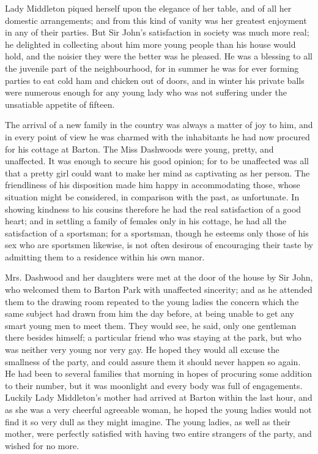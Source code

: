 Lady Middleton piqued herself upon the elegance of her table, and of all her domestic arrangements; and from this kind of vanity was her greatest enjoyment in any of their parties. But Sir John's satisfaction in society was much more real; he delighted in collecting about him more young people than his house would hold, and the noisier they were the better was he pleased. He was a blessing to all the juvenile part of the neighbourhood, for in summer he was for ever forming parties to eat cold ham and chicken out of doors, and in winter his private balls were numerous enough for any young lady who was not suffering under the unsatiable appetite of fifteen.

The arrival of a new family in the country was always a matter of joy to him, and in every point of view he was charmed with the inhabitants he had now procured for his cottage at Barton. The Miss Dashwoods were young, pretty, and unaffected. It was enough to secure his good opinion; for to be unaffected was all that a pretty girl could want to make her mind as captivating as her person. The friendliness of his disposition made him happy in accommodating those, whose situation might be considered, in comparison with the past, as unfortunate. In showing kindness to his cousins therefore he had the real satisfaction of a good heart; and in settling a family of females only in his cottage, he had all the satisfaction of a sportsman; for a sportsman, though he esteems only those of his sex who are sportsmen likewise, is not often desirous of encouraging their taste by admitting them to a residence within his own manor.

Mrs. Dashwood and her daughters were met at the door of the house by Sir John, who welcomed them to Barton Park with unaffected sincerity; and as he attended them to the drawing room repeated to the young ladies the concern which the same subject had drawn from him the day before, at being unable to get any smart young men to meet them. They would see, he said, only one gentleman there besides himself; a particular friend who was staying at the park, but who was neither very young nor very gay. He hoped they would all excuse the smallness of the party, and could assure them it should never happen so again. He had been to several families that morning in hopes of procuring some addition to their number, but it was moonlight and every body was full of engagements. Luckily Lady Middleton's mother had arrived at Barton within the last hour, and as she was a very cheerful agreeable woman, he hoped the young ladies would not find it so very dull as they might imagine. The young ladies, as well as their mother, were perfectly satisfied with having two entire strangers of the party, and wished for no more.

